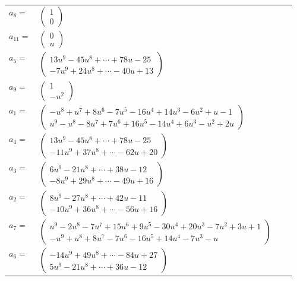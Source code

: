\documentclass[1p]{elsarticle_modified}
\theoremstyle{definition}
\begin{document}
\begin{tabular}{m{7pt} m{180pt} m{7pt} m{180pt} }
\flushright $a_{8}=$&$\begin{pmatrix}1\\0\end{pmatrix}$ \\
\flushright $a_{11}=$&$\begin{pmatrix}0\\u\end{pmatrix}$ \\
\flushright $a_{5}=$&$\begin{pmatrix}13 u^9-45 u^8+\cdots+78 u-25\\-7 u^9+24 u^8+\cdots-40 u+13\end{pmatrix}$ \\
\flushright $a_{9}=$&$\begin{pmatrix}1\\- u^2\end{pmatrix}$ \\
\flushright $a_{1}=$&$\begin{pmatrix}- u^8+u^7+8 u^6-7 u^5-16 u^4+14 u^3-6 u^2+u-1\\u^9- u^8-8 u^7+7 u^6+16 u^5-14 u^4+6 u^3- u^2+2 u\end{pmatrix}$ \\
\flushright $a_{4}=$&$\begin{pmatrix}13 u^9-45 u^8+\cdots+78 u-25\\-11 u^9+37 u^8+\cdots-62 u+20\end{pmatrix}$ \\
\flushright $a_{3}=$&$\begin{pmatrix}6 u^9-21 u^8+\cdots+38 u-12\\-8 u^9+29 u^8+\cdots-49 u+16\end{pmatrix}$ \\
\flushright $a_{2}=$&$\begin{pmatrix}8 u^9-27 u^8+\cdots+42 u-11\\-10 u^9+36 u^8+\cdots-56 u+16\end{pmatrix}$ \\
\flushright $a_{7}=$&$\begin{pmatrix}u^9-2 u^8-7 u^7+15 u^6+9 u^5-30 u^4+20 u^3-7 u^2+3 u+1\\- u^9+u^8+8 u^7-7 u^6-16 u^5+14 u^4-7 u^3- u\end{pmatrix}$ \\
\flushright $a_{6}=$&$\begin{pmatrix}-14 u^9+49 u^8+\cdots-84 u+27\\5 u^9-21 u^8+\cdots+36 u-12\end{pmatrix}$ \\

\end{tabular}
\end{document}
